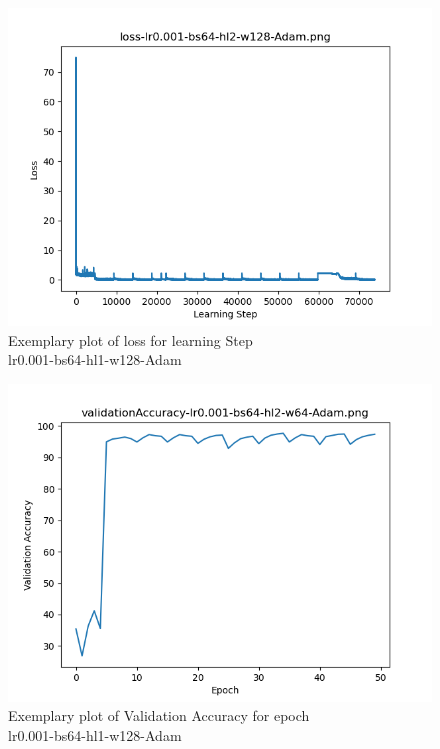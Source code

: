 \documentclass{article}[12pt]
\begin{document}
\begin{figure}[H]
    \caption{Exemplary plot of loss for learning Step \\ lr0.001-bs64-hl1-w128-Adam }
    \includegraphics[width=\textwidth]{testsResults/loss/def.png}
    \centering
    \end{figure}
\begin{figure}[H]
    \caption{Exemplary plot of Validation Accuracy for epoch \\ lr0.001-bs64-hl1-w128-Adam }
    \includegraphics[width=\textwidth]{testsResults/validationAccuracy/validationAccuracy-lr0.001-bs64-hl2-w64-Adam.png}
    \centering
    \end{figure}
\end{document}
